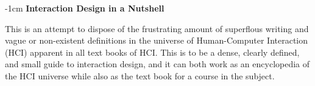 \newpage
\thispagestyle{empty}
\vspace*{3cm}
\begin{adjustwidth*}{}{-1cm}
  \noindent \textbf{Interaction Design in a Nutshell}

  \vspace*{4pt}
  
  \noindent This is an attempt to dispose of the frustrating amount of superflous writing and vague or non-existent definitions in the universe of Human-Computer Interaction (HCI) apparent in all text books of HCI. This is to be a dense, clearly defined, and small guide to interaction design, and it can both work as an encyclopedia of the HCI universe while also as the text book for a course in the subject.
\end{adjustwidth*}
